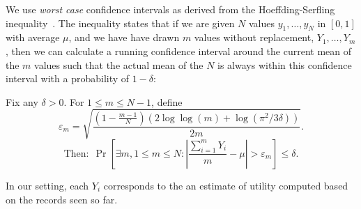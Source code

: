 We use {\it worst case} confidence intervals as derived from
the Hoeffding-Serfling inequality~\cite{serfling1974probability}.
The inequality states that if we are given $N$ values $y_1, \ldots, y_N$ in 
$[0, 1]$ with average $\mu$, and we have have drawn $m$ values without replacement, $Y_1, \ldots, Y_m$, 
then we can calculate a running confidence interval around the current mean 
of the $m$ values such that the actual mean of the $N$
is always within this confidence interval with a probability of $1 - \delta$:
\begin{theorem}
\label{thm:hs}
Fix any $\delta > 0$. For $1 \le m \le N-1$, define
{\small $$
\varepsilon_m = \sqrt{\frac{(1-\frac{m-1}N)(2\log \log (m) + \log(\pi^2/3\delta))}{2m}}.
$$
$$
\textrm{Then:} \ \   \Pr\left[ \exists m, 1 \le m \le N : 
  \left|\frac{\sum_{i=1}^m Y_i}{m} - \mu\right| > \varepsilon_m \right] 
\le \delta.
$$
}
\end{theorem}
\vspace{-5pt}
In our setting, each $Y_i$ corresponds to the an estimate of utility computed based on the
records seen so far. 



